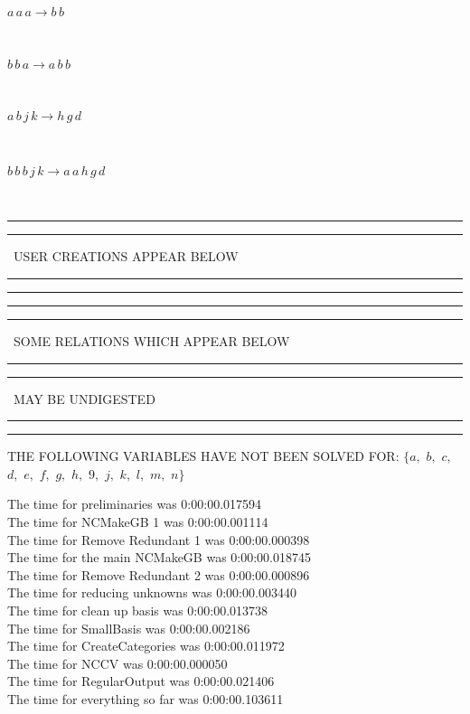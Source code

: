 \documentclass[rep10,leqno]{report}
\begin{document}
\begin{minipage}{6in}
$
a\,
 a\,
 a\rightarrow b\,
 b
$
\end{minipage}\medskip \\
\begin{minipage}{6in}
$
b\,
 b\,
 a\rightarrow a\,
 b\,
 b
$
\end{minipage}\medskip \\
\begin{minipage}{6in}
$
a\,
 b\,
 j\,
 k\rightarrow h\,
 g\,
 d
$
\end{minipage}\medskip \\
\begin{minipage}{6in}
$
b\,
 b\,
 b\,
 j\,
 k\rightarrow a\,
 a\,
 h\,
 g\,
 d
$
\end{minipage}\\
\rule[2pt]{6in}{1pt}\hfil\break
\rule[2.5pt]{1.701in}{1pt}
\ USER CREATIONS APPEAR BELOW\ 
\rule[2.5pt]{1.701in}{1pt}\hfil\break
\rule[2pt]{6in}{1pt}\hfil\break
\rule[2pt]{6in}{4pt}\hfil\break
\rule[2pt]{1.45in}{4pt}
\ SOME RELATIONS WHICH APPEAR BELOW\ 
\rule[2pt]{1.45in}{4pt}\hfil\break
\rule[2pt]{2.18in}{4pt}
\ MAY BE UNDIGESTED\ 
\rule[2pt]{2.18in}{4pt}\hfil\break
\rule[2pt]{6in}{4pt}\hfil\break
THE FOLLOWING VARIABLES HAVE NOT BEEN SOLVED FOR:\hfil\break
$\{a,
$ $
b,
$ $
c,
$ $
d,
$ $
e,
$ $
f,
$ $
g,
$ $
h,
$ $
9,
$ $
j,
$ $
k,
$ $
l,
$ $
m,
$ $
n\}$
\smallskip\\
\vspace{10pt}

\noindent
The time for preliminaries was 0:00:00.017594\\
The time for NCMakeGB 1 was 0:00:00.001114\\
The time for Remove Redundant 1 was 0:00:00.000398\\
The time for the main NCMakeGB was 0:00:00.018745\\
The time for Remove Redundant 2 was 0:00:00.000896\\
The time for reducing unknowns was 0:00:00.003440\\
The time for clean up basis was 0:00:00.013738\\
The time for SmallBasis was 0:00:00.002186\\
The time for CreateCategories was 0:00:00.011972\\
The time for NCCV was 0:00:00.000050\\
The time for RegularOutput was 0:00:00.021406\\
The time for everything so far was 0:00:00.103611\\
\end{document}
